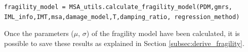 \begin{Verbatim}[frame=single, commandchars=\\\{\}, samepage=true]
fragility_model = MSA_utils.calculate_fragility_model(PDM,gmrs,
IML_info,IMT,msa,damage_model,T,damping_ratio, regression_method)
\end{Verbatim}

Once the parameters ($\mu$, $\sigma$) of the fragility model have been calculated, it is possible to save these results as explained in Section \ref{subsec:derive_fragility}.
